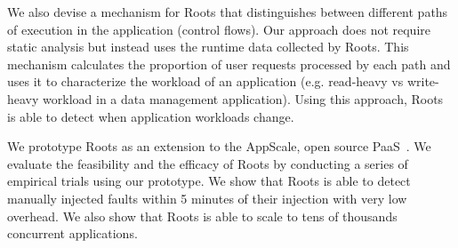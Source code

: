 We also devise a mechanism for Roots that distinguishes
between different paths of execution in the application (control flows).
Our approach does not require static analysis but instead uses the 
runtime data collected by Roots. This mechanism calculates the 
proportion of user requests processed by each path and uses it to 
characterize the workload
of an application (e.g. read-heavy vs write-heavy workload 
in a data management
application). Using this approach, Roots is able to
detect when application workloads change.

We prototype
Roots as an extension to the AppScale, open source PaaS~\cite{6488671}. 
We evaluate the feasibility and the 
efficacy of Roots by conducting a series of empirical trials 
using our prototype. We show that Roots is able to detect manually injected
faults within 5 minutes of their injection with very low overhead.
We also show that Roots is able to scale to tens of thousands 
concurrent applications.

